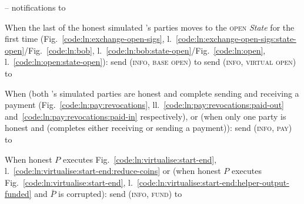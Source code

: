 \begin{center}
\begin{simulatorbox}{\simulator{} -- notifications to \fchan}
\begin{algorithmic}[1]
      \State When the last of the honest simulated \fchan's parties moves to the
      \textsc{open} \textit{State} for the first time
      (Fig.~\ref{code:ln:exchange-open-sigs},
      l.~\ref{code:ln:exchange-open-sigs:state-open}/Fig.~\ref{code:ln:bob},
      l.~\ref{code:ln:bob:state-open}/Fig.~\ref{code:ln:open},
      l.~\ref{code:ln:open:state-open}):
      \label{code:simulator:when-open}
      \Indent
          \State send (\textsc{info}, \textsc{base open}) to \fchan
          \label{code:simulator:base-open}
        \Else
          \State send (\textsc{info}, \textsc{virtual open}) to \fchan
          \label{code:simulator:virtual-open}
        \EndIf
      \EndIndent
      \Statex

      \State When (both \fchan's simulated parties are honest and complete
      sending and receiving a payment (Fig.~\ref{code:ln:pay:revocations},
      ll.~\ref{code:ln:pay:revocations:paid-out}
      and~\ref{code:ln:pay:revocations:paid-in} respectively), or (when only one
      party is honest and (completes either receiving or sending a payment)):
      \label{code:simulator:when-pay}
      \Indent
        \State send (\textsc{info}, \textsc{pay}) to \fchan
      \EndIndent
      \Statex

      \State When honest $P$ executes Fig.~\ref{code:ln:virtualise:start-end},
      l.~\ref{code:ln:virtualise:start-end:reduce-coins} or (when honest $P$
      executes Fig.~\ref{code:ln:virtualise:start-end},
      l.~\ref{code:ln:virtualise:start-end:helper-output-funded} and $\bar{P}$
      is corrupted): 
      \label{code:simulator:when-fund}
      \Indent
        \State send (\textsc{info}, \textsc{fund}) to \fchan
      \EndIndent
      \Statex


\end{algorithmic}
\end{simulatorbox}
\end{center}
